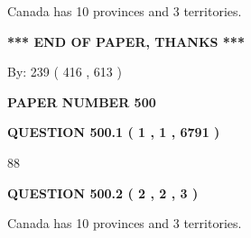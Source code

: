 \documentclass[12pt]{article}
\begin{document}
  
 
 
\noindent{}
 
 
Canada has 10  provinces and 3 territories.
 
 
 
 
   
   
 \vspace{0.2in}
 
   
   
   
   
\vspace{1.0in} 
{\textbf{\large{ *** END OF PAPER, THANKS *** }}} 
   
   
\hspace{1.0in} By: 
 239 ( 416 ,  613 )
   
   
   
   
\newpage 
\setcounter{page}{ 
   500001 } 
   
   
   
   
 {\textbf{ \Large{ PAPER NUMBER  500  }}}
   
   
\vspace{0.2in}
   
   
   
   
   
   
 \vspace{0.2in}
 
 
 
 
   
   
  
\vspace{0.2in}
  
{\textbf{\Large{QUESTION
500.1 
 ( 1 , 1 , 6791 )
}}}
  
  
 
 
\noindent{}

88
 
 
  
\vspace{0.2in}
  
{\textbf{\Large{QUESTION
500.2 
 ( 2 , 2 , 3 )
}}}
  
  
 
 
\noindent{}
 
 
Canada has 10  provinces and 3 territories.
 
\end{document}
